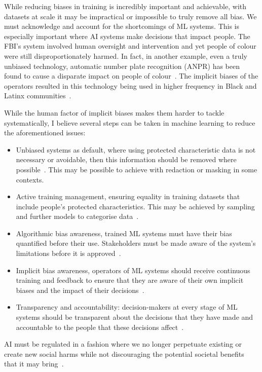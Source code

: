 \documentclass[]{final_report}
\begin{document}
\newpage
While reducing biases in training is incredibly important and achievable, with datasets at scale it may be impractical or impossible to truly remove all bias. We must acknowledge and account for the shortcomings of ML systems. This is especially important where AI systems make decisions that impact people. The FBI's system involved human oversight and intervention and yet people of colour were still disproportionately harmed. In fact, in another example, even a truly unbiased technology, automatic number plate recognition (ANPR) has been found to cause a disparate impact on people of colour~\cite{anprAccountability}. The implicit biases of the operators resulted in this technology being used in higher frequency in Black and Latinx communities~\cite{anprAccountability,facialRecognitionBias}.

While the human factor of implicit biases makes them harder to tackle systematically, I believe several steps can be taken in machine learning to reduce  the aforementioned issues:
\begin{itemize}
  \item Unbiased systems as default, where using protected characteristic data is not necessary or avoidable, then this information should be removed where possible~\cite{AIRisksAndPrinciples}. This may be possible to achieve with redaction or masking in some contexts.
  \item Active training management, ensuring equality in training datasets that include people's protected characteristics. This may be achieved by sampling and further models to categorise data~\cite{AIRisksAndPrinciples}.
  \item Algorithmic bias awareness, trained ML systems must have their bias quantified before their use. Stakeholders must be made aware of the system's limitations before it is approved~\cite{AIRisksAndPrinciples}.
  \item Implicit bias awareness, operators of ML systems should receive continuous training and feedback to ensure that they are aware of their own implicit biases and the impact of their decisions~\cite{facialRecognitionBias}.
  \item Transparency and accountability: decision-makers at every stage of ML systems should be transparent about the decisions that they have made and accountable to the people that these decisions affect~\cite{AIRisksAndPrinciples}.
\end{itemize}
AI must be regulated in a fashion where we no longer perpetuate existing or create new social harms while not discouraging the potential societal benefits that it may bring~\cite{AIRisksAndPrinciples}. 
\end{document}
